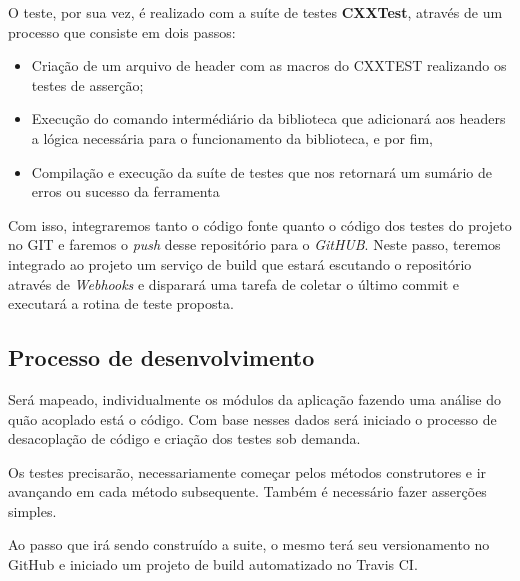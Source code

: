 \documentclass[
	article,			%
	12pt,				%
	oneside,			%
	a4paper,			%
	english,			%
	brazil,				%
	sumario=tradicional
	]{abntex2}
\begin{document}
O teste, por sua vez, é realizado com a suíte de testes \textbf{CXXTest}, através de um processo que consiste em dois passos:

\begin{itemize}
	\item{Criação de um arquivo de header com as macros do CXXTEST realizando os testes de asserção;}
	\item{Execução do comando intermédiário da biblioteca que adicionará aos headers a lógica necessária para o funcionamento da biblioteca, e por fim,}
	\item{Compilação e execução da suíte de testes que nos retornará um sumário de erros ou sucesso da ferramenta}
\end{itemize}

Com isso, integraremos tanto o código fonte quanto o código dos testes do projeto no GIT e faremos o \textit{push} desse repositório para o \textit{GitHUB}. Neste passo, teremos integrado ao projeto um serviço de build que estará escutando o repositório através de \textit{Webhooks} e disparará uma tarefa de coletar o último commit e executará a rotina de teste proposta.

\subsection{Processo de desenvolvimento}
Será mapeado, individualmente os módulos da aplicação fazendo uma análise do quão acoplado está o código. Com base nesses dados será iniciado o processo de desacoplação de código e criação dos testes sob demanda.

Os testes precisarão, necessariamente começar pelos métodos construtores e ir avançando em cada método subsequente. Também é necessário fazer asserções simples.

Ao passo que irá sendo construído a suite, o mesmo terá seu versionamento no GitHub e iniciado um projeto de build automatizado no Travis CI.

% 



\end{document}
